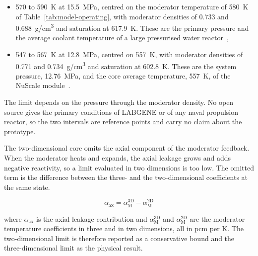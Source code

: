 \begin{itemize}
  \item 570 to \SI{590}{K} at \SI{15.5}{MPa}, centred on the moderator
        temperature of \SI{580}{K} of Table~\ref{tab:model-operating},
        with moderator densities of 0.733 and \SI{0.688}{g/cm^3}
        and saturation at \SI{617.9}{K}.
        These are the primary pressure and the average coolant
        temperature of a large pressurised water
        reactor~\cite{todreas_kazimi_2012,epr_fsar_ch4},

  \item 547 to \SI{567}{K} at \SI{12.8}{MPa}, centred on \SI{557}{K},
        with moderator densities of 0.771 and \SI{0.734}{g/cm^3}
        and saturation at \SI{602.8}{K}.
        These are the system pressure, \SI{12.76}{MPa}, and the core
        average temperature, \SI{557}{K}, of the NuScale
        module~\cite{nuscale_htp2_2017}.
\end{itemize}

The limit depends on the pressure through the moderator density. No
open source gives the primary conditions of LABGENE or of any naval
propulsion reactor, so the two intervals are reference points and carry
no claim about the prototype.

The two-dimensional core omits the axial component of the moderator
feedback. When the moderator heats and expands, the axial leakage grows
and adds negative reactivity, so a limit evaluated in two dimensions
is too low. The omitted term is the difference between the three- and
the two-dimensional coefficients at the same state.

\begin{equation}
\alpha_\mathrm{ax} = \alpha_\mathrm{M}^\mathrm{3D} - \alpha_\mathrm{M}^\mathrm{2D}
\label{eq:axial-feedback}
\end{equation}

\noindent where $\alpha_\mathrm{ax}$ is the axial leakage contribution
and $\alpha_\mathrm{M}^\mathrm{3D}$ and $\alpha_\mathrm{M}^\mathrm{2D}$
are the moderator temperature coefficients in three and in two
dimensions, all in pcm per K. The two-dimensional limit is therefore
reported as a conservative bound and the three-dimensional limit as
the physical result.


\label{sec:meth-mtc-checks}



